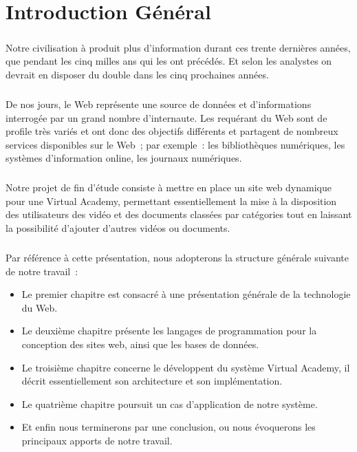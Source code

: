 \chapter*{\centering Introduction Général} 
	\paragraph{}
	Notre civilisation à produit plus d’information durant ces trente dernières années, que pendant les cinq milles ans qui les ont précédés. Et selon les analystes on devrait en disposer du double dans les cinq prochaines années.
	\paragraph{}
	De nos jours, le Web représente une source de données et d’informations interrogée par un grand nombre d’internaute. Les requérant du Web sont de profile très variés et ont donc des objectifs différents et partagent de nombreux services disponibles sur le Web ; par exemple : les bibliothèques numériques, les systèmes d’information online, les journaux numériques.
	\paragraph{}
	Notre projet de fin d’étude consiste à mettre en place un site web dynamique pour une Virtual Academy, permettant essentiellement la mise à la disposition des utilisateurs des vidéo et des documents   classées par catégories tout en laissant la possibilité d’ajouter d’autres vidéos ou documents.
	\paragraph{}
	Par référence à cette présentation, nous adopterons la structure générale suivante de notre travail :
	
	\begin{itemize}
		\item Le premier chapitre est consacré à une présentation générale de la technologie du Web.
		\item Le deuxième chapitre présente les langages de programmation pour la conception des sites web, ainsi que les bases de données.
		\item Le troisième chapitre concerne le développent du système Virtual Academy, il décrit essentiellement son architecture et son implémentation.
		\item Le quatrième chapitre poursuit un cas d’application de notre système.
		\item Et enfin nous terminerons par une conclusion, ou nous évoquerons les principaux apports de notre travail.
	\end{itemize}